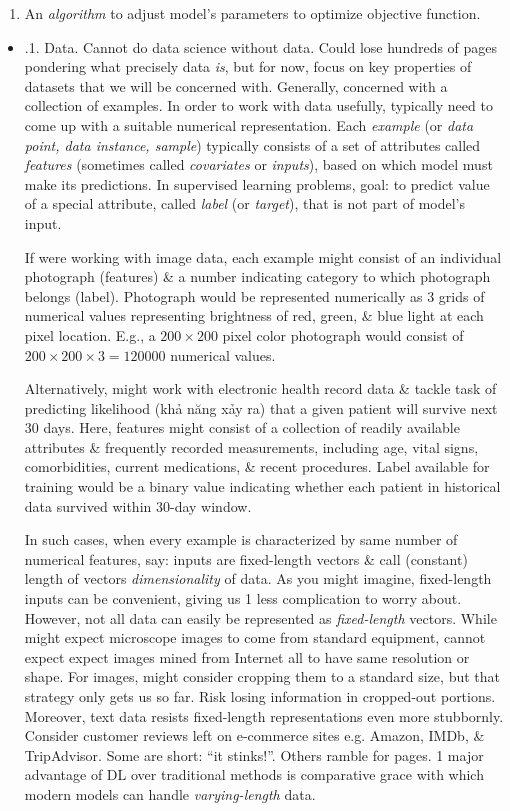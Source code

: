\documentclass{article}
\begin{document}
\begin{itemize}
\begin{itemize}
\begin{enumerate}
			\item An {\it algorithm} to adjust model's parameters to optimize objective function.
		\end{enumerate}
		\begin{itemize}
			\item {.1. Data.} Cannot do data science without data. Could lose hundreds of pages pondering what precisely data {\it is}, but for now, focus on key properties of datasets that we will be concerned with. Generally, concerned with a collection of examples. In order to work with data usefully, typically need to come up with a suitable numerical representation. Each {\it example} (or {\it data point, data instance, sample}) typically consists of a set of attributes called {\it features} (sometimes called {\it covariates} or {\it inputs}), based on which model must make its predictions. In supervised learning problems, goal: to predict value of a special attribute, called {\it label} (or {\it target}), that is not part of model's input.

			If were working with image data, each example might consist of an individual photograph (features) \& a number indicating category to which photograph belongs (label). Photograph would be represented numerically as 3 grids of numerical values representing brightness of red, green, \& blue light at each pixel location. E.g., a $200\times200$ pixel color photograph would consist of $200\times200\times3 = 120000$ numerical values.

			Alternatively, might work with electronic health record data \& tackle task of predicting likelihood (khả năng xảy ra) that a given patient will survive next 30 days. Here, features might consist of a collection of readily available attributes \& frequently recorded measurements, including age, vital signs, comorbidities, current medications, \& recent procedures. Label available for training would be a binary value indicating whether each patient in historical data survived within 30-day window.

			In such cases, when every example is characterized by same number of numerical features, say: inputs are fixed-length vectors \& call (constant) length of vectors {\it dimensionality} of data. As you might imagine, fixed-length inputs can be convenient, giving us 1 less complication to worry about. However, not all data can easily be represented as {\it fixed-length} vectors. While might expect microscope images to come from standard equipment, cannot expect expect images mined from Internet all to have same resolution or shape. For images, might consider cropping them to a standard size, but that strategy only gets us so far. Risk losing information in cropped-out portions. Moreover, text data resists fixed-length representations even more stubbornly. Consider customer reviews left on e-commerce sites e.g. Amazon, IMDb, \& TripAdvisor. Some are short: ``it stinks!''. Others ramble for pages. 1 major advantage of DL over traditional methods is comparative grace with which modern models can handle {\it varying-length} data.


\end{itemize}
\end{itemize}
\end{itemize}
\end{document}
